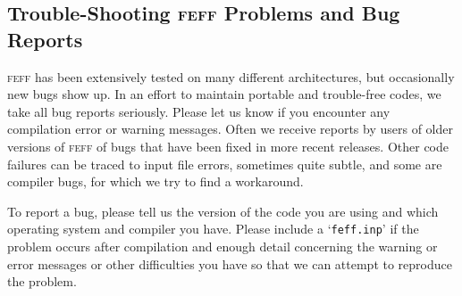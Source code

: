 \documentclass[11pt,oneside]{report} %
\newcommand{\program}[1]{\textsc{#1}}
\newcommand{\feff}{\program{feff}}
\newcommand{\file}[1]{`\texttt{#1}'}
\begin{document}
\begin{latexonly}

\chapter{Trouble-Shooting {\feff} Problems and Bug Reports}
\label{sec:Append-H-Trouble}

{\feff} has been extensively tested on many different architectures,
but occasionally new bugs show up. In an effort to maintain portable
and trouble-free codes, we take all bug reports seriously. Please
let us know if you encounter any compilation error or warning messages.
Often we receive reports by users of older
versions of {\feff} of bugs that have been fixed in more recent
releases. Other code failures can be traced to input file
errors, sometimes quite subtle, and some are compiler bugs, for which
we try to find a workaround.

To  report a bug, please tell us the version of the code you are using
and which operating system and compiler you have. Please include a
\file{feff.inp} if the problem occurs after compilation
and enough detail concerning the warning or error messages or
other difficulties you have so that we can attempt to reproduce the problem.


\end{latexonly}
\end{document}
